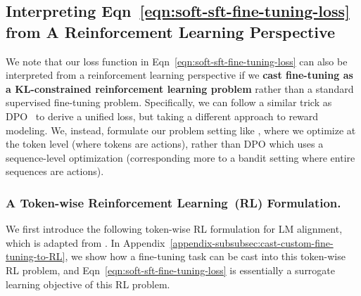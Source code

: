 \subsection{Interpreting Eqn~\ref{eqn:soft-sft-fine-tuning-loss} from A Reinforcement Learning Perspective}
\label{appendix:loss-rl-perspective}



We note that our loss function in Eqn~\ref{eqn:soft-sft-fine-tuning-loss} can also be interpreted from a reinforcement learning perspective if we \textbf{cast fine-tuning as a KL-constrained reinforcement learning problem} rather than a standard supervised fine-tuning problem. 
Specifically, we can follow a similar trick as DPO~\cite{rafailov2023direct} to derive a unified loss, but taking a different approach to reward modeling. 
We, instead, formulate our problem setting like \citet{mudgal2024controlled}, where we optimize at the token level (where tokens are actions), rather than DPO which uses a sequence-level optimization (corresponding more to a bandit setting where entire sequences are actions).


\subsubsection{A Token-wise Reinforcement Learning~(RL) Formulation.}
\label{appendix-subsubsection:token-wise-rl-formulation-basics}

We first introduce the following token-wise RL formulation for LM alignment, which is adapted from \citet{mudgal2024controlled}. In Appendix~\ref{appendix-subsubsec:cast-custom-fine-tuning-to-RL}, we show how a fine-tuning task can be cast into this token-wise RL problem, and Eqn~\ref{eqn:soft-sft-fine-tuning-loss} is essentially a surrogate learning objective of this RL problem.



